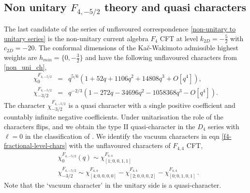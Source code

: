 \documentclass[a4paper,12pt]{article}
\begin{document}
\subsection{Non unitary \ensuremath{F_{4,-5/2}} theory and quasi characters}
The last candidate of the series of unflavoured correspondence \eqref{non-unitary to unitary series} is the non-unitary current algebra $F_4$ CFT at level $k_{2D}=-\frac{5}{2}$ with $c_{2D}=-20$. The conformal dimensions of the Ka\v c-Wakimoto admissible highest weights are $h_{min}=\{0,-\frac{3}{2}\}$ and have the following unflavoured characters from \eqref{non_uni_ch},
%
\begin{eqnarray}\label{f4-fractional-level-chars}
\chi^{F_{4,-5/2}}_0 & = & q^{5/6}\left(1+52 q+1106 q^{2}+14808 q^{3}+ \textit{O}[q^4]\right),\nonumber\\
\chi^{F_{4,-5/2}}_{-3/2} & = & {q^{-2/3}}\left(1-272 q-34696 q^{2}-1058368 q^{3}-\textit{O}[q^4]\right).
\end{eqnarray}
%
The character $\chi^{F_{4,-5/2}}_{-3/2}$ is a quasi character with a single positive coefficient and countably infinite negative coefficients. Under unitarisation the role of the characters flips, and we obtain the type II quasi-character in the $D_4$ series with $\ell=0$ in the classification of \cite{Chandra:2018pjq}. We identify the vacuum characters in eqn \eqref{f4-fractional-level-chars} with the unflavoured characters of $F_{4,4}$ CFT,
\begin{align}
    &\chi^{F_{4,-5/2}}_0(q)\sim \chi^{F_{4,4}}_{[1;0,0,1,1]}\, \nonumber\\
    &\chi^{F_{4,-5/2}}_{-3/2}\sim \chi^{F_{4,4}}_{[4;0,0,0,0]}-\chi^{F_{4,4}}_{[2;0,0,0,2]}-\chi^{F_{4,4}}_{[0;0,1,0,1]}\, .
\end{align}
Note that the `vacuum character' in the unitary side is a quasi-character. 
\end{document}
